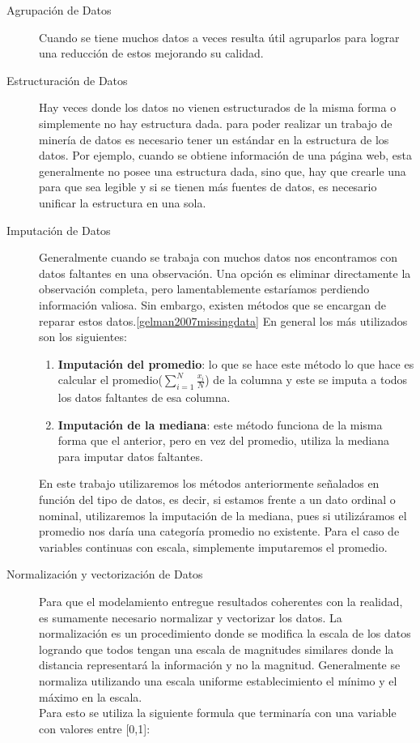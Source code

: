 \begin{description}
  \item[Agrupación de Datos]
  Cuando se tiene muchos datos a veces resulta útil agruparlos para lograr una reducción de estos mejorando su calidad.
  \item[Estructuración de Datos]
  Hay veces donde los datos no  vienen estructurados de la misma forma o simplemente no hay estructura dada. para poder realizar un trabajo de minería de datos es necesario tener un estándar en la estructura de los datos. Por ejemplo, cuando se obtiene información de una página web, esta generalmente no posee una estructura dada, sino que, hay que crearle una para que sea legible y si se tienen más fuentes de datos, es necesario unificar la estructura en una sola.
  \item[Imputación de Datos]
  Generalmente cuando se trabaja con muchos datos nos encontramos con datos faltantes en una observación. Una opción es eliminar directamente la observación completa, pero lamentablemente estaríamos perdiendo información valiosa. Sin embargo, existen métodos que se encargan de reparar estos datos.\ref{gelman2007missingdata} En general los más utilizados son los siguientes:
 \begin{enumerate}[label=\itshape\alph*\upshape)]
  \item \textbf{Imputación del promedio}: lo que se hace este método lo que hace es calcular el promedio($\sum_{i=1}^N \frac{x_i}{N}$) de la columna y este se imputa a todos los datos faltantes de esa columna.
  \item \textbf{Imputación de la mediana}: este método funciona de la misma forma que el anterior, pero en vez del promedio, utiliza la mediana para imputar datos faltantes.
  \end{enumerate}
  En este trabajo utilizaremos los métodos anteriormente señalados en función del tipo de datos, es decir, si estamos frente a un dato ordinal o nominal, utilizaremos la imputación de la mediana, pues si utilizáramos el promedio nos daría una categoría promedio no existente. Para el caso de variables continuas con escala, simplemente imputaremos el promedio.
  \item[Normalización y vectorización de Datos]
  Para que el modelamiento entregue resultados coherentes con la realidad, es sumamente necesario normalizar y vectorizar los datos.%
  La normalización es un procedimiento donde se modifica la escala de los datos logrando que todos tengan una escala de magnitudes similares donde la distancia representará la información y no la magnitud. Generalmente se normaliza utilizando una escala uniforme establecimiento el mínimo y el máximo en la escala. \\Para esto se utiliza la siguiente formula que terminaría con una variable con valores entre [0,1]:

\end{description}
